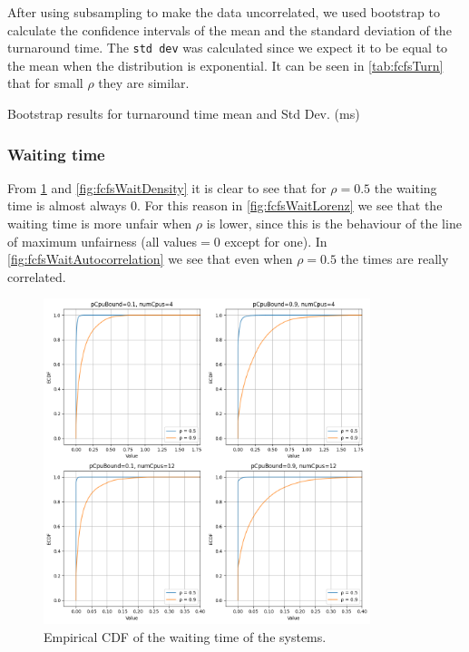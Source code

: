 After using subsampling to make the data uncorrelated, we used bootstrap to calculate the confidence intervals of the mean and the standard deviation of the turnaround time. The \texttt{std dev} was calculated since we expect it to be equal to the mean when the distribution is exponential. It can be seen in \cref{tab:fcfsTurn} that for small $\rho$ they are similar.

\begin{table}[H]
    \centering
    \scriptsize
    
    \caption{Bootstrap results for turnaround time mean and Std Dev. (ms)}
    \label{tab:fcfsTurn}
\end{table}


\subsubsection{Waiting time}

From \cref{fig:fcfsWaitEcdf} and \cref{fig:fcfsWaitDensity} it is clear to see that for $\rho = 0.5$ the waiting time is almost always $0$. For this reason in \cref{fig:fcfsWaitLorenz} we see that the waiting time is more unfair when $\rho$ is lower, since this is the behaviour of the line of maximum unfairness (all values$ = 0$ except for one). In \cref{fig:fcfsWaitAutocorrelation} we see that even when $\rho = 0.5$ the times are really correlated.

\begin{figure}[H]
    \captionsetup{type=figure}
    \centering
    \includegraphics[width=0.85\textwidth]{./images/04/fcfs/wait/ecdf.png}
    \caption{Empirical CDF of the waiting time of the systems.}
    \label{fig:fcfsWaitEcdf}
\end{figure}

